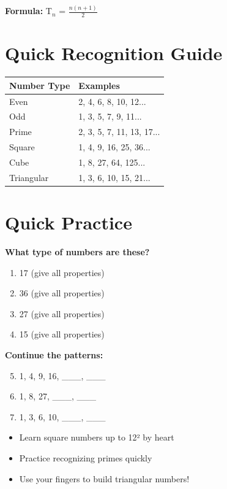 \documentclass[a4paper,11pt]{article}
\begin{document}
\textbf{Formula:} T$_n$ = $\frac{n(n+1)}{2}$

\section{Quick Recognition Guide}

\begin{center}
\begin{tabular}{|l|l|}
\hline
\textbf{Number Type} & \textbf{Examples} \\
\hline
Even & 2, 4, 6, 8, 10, 12... \\
\hline
Odd & 1, 3, 5, 7, 9, 11... \\
\hline
Prime & 2, 3, 5, 7, 11, 13, 17... \\
\hline
Square & 1, 4, 9, 16, 25, 36... \\
\hline
Cube & 1, 8, 27, 64, 125... \\
\hline
Triangular & 1, 3, 6, 10, 15, 21... \\
\hline
\end{tabular}
\end{center}

\section{Quick Practice}

\textbf{What type of numbers are these?}
\begin{enumerate}
    \item 17 (give all properties)
    \item 36 (give all properties)
    \item 27 (give all properties)
    \item 15 (give all properties)
\end{enumerate}

\textbf{Continue the patterns:}
\begin{enumerate}
    \setcounter{enumi}{4}
    \item 1, 4, 9, 16, \_\_\_, \_\_\_
    \item 1, 8, 27, \_\_\_, \_\_\_
    \item 1, 3, 6, 10, \_\_\_, \_\_\_
\end{enumerate}

\vspace{1cm}

\begin{tcolorbox}[colback=gray!10!white,colframe=gray!50!black,title=\textbf{Memory Tips}]
\begin{itemize}
    \item Learn square numbers up to 12² by heart
    \item Practice recognizing primes quickly
    \item Use your fingers to build triangular numbers!
\end{itemize}
\end{tcolorbox}
\end{document}
